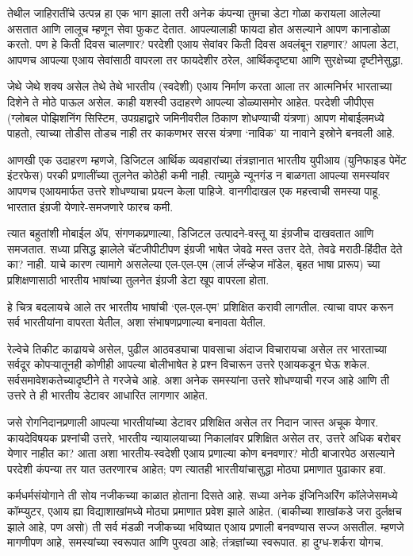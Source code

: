 तेथील जाहिरातींचे उत्पन्न हा एक भाग झाला तरी अनेक कंपन्या तुमचा डेटा गोळा करायला आलेल्या असतात आणि लालूच म्हणून सेवा फुकट देतात. आपल्यालाही फायदा होत असल्याने आपण कानाडोळा करतो. पण हे किती दिवस चालणार? परदेशी एआय सेवांवर किती दिवस अवलंबून राहणार? आपला डेटा, आपणच आपल्या एआय सेवांसाठी वापरला तर फायदेशीर ठरेल, आर्थिकदृष्ट्या आणि सुरक्षेच्या दृष्टीनेसुद्धा.

जेथे जेथे शक्य असेल तेथे तेथे भारतीय (स्वदेशी) एआय निर्माण करता आला तर आत्मनिर्भर भारताच्या दिशेने ते मोठे पाऊल असेल. काही यशस्वी उदाहरणे आपल्या डोळ्यासमोर आहेत. परदेशी जीपीएस (ग्लोबल पोझिशनिंग सिस्टिम, उपग्रहाद्वारे जमिनीवरील ठिकाण शोधण्याची यंत्रणा) आपण मोबाईलमध्ये पाहतो, त्याच्या तोडीस तोडच नाही तर काकणभर सरस यंत्रणा `नाविक' या नावाने इस्रोने बनवली आहे.

आणखी एक उदाहरण म्हणजे, डिजिटल आर्थिक व्यवहारांच्या तंत्रज्ञानात भारतीय युपीआय (युनिफाइड पेमेंट इंटरफेस) परकी प्रणालींच्या तुलनेत कोठेही कमी नाही. त्यामुळे न्यूनगंड न बाळगता आपल्या समस्यांवर आपणच एआयमार्फत उत्तरे शोधण्याचा प्रयत्न केला पाहिजे. वानगीदाखल एक महत्त्वाची समस्या पाहू. भारतात इंग्रजी येणारे-समजणारे फारच कमी.

त्यात बहुतांशी मोबाईल ॲप, संगणकप्रणाल्या, डिजिटल उत्पादने-वस्तू या इंग्रजीच दाखवतात आणि समजतात. सध्या प्रसिद्ध झालेले चॅटजीपीटीपण इंग्रजी भाषेत जेवढे मस्त उत्तर देते, तेवढे मराठी-हिंदीत देते का? नाही. याचे कारण त्यामागे असलेल्या एल-एल-एम (लार्ज लॅन्व्हेज मॉडेल, बृहत भाषा प्रारूप) च्या प्रशिक्षणासाठी भारतीय भाषांच्या तुलनेत इंग्रजी डेटा खूप वापरला होता.

हे चित्र बदलायचे आले तर भारतीय भाषांची `एल-एल-एम' प्रशिक्षित करावी लागतील. त्याचा वापर करून सर्व भारतीयांना वापरता येतील, अशा संभाषणप्रणाल्या बनावता येतील.

रेल्वेचे तिकीट काढायचे असेल, पुढील आठवड्याचा पावसाचा अंदाज विचारायचा असेल तर भारताच्या सर्वदूर कोपऱ्यातूनही कोणीही आपल्या बोलीभाषेत हे प्रश्न विचारून उत्तरे एआयकडून घेऊ शकेल. सर्वसमावेशकतेच्यादृष्टीने ते गरजेचे आहे. अशा अनेक समस्यांना उत्तरे शोधण्याची गरज आहे आणि ती उत्तरे ते ही भारतीय डेटावर आधारित लागणार आहेत.

जसे रोगनिदानप्रणाली आपल्या भारतीयांच्या डेटावर प्रशिक्षित असेल तर निदान जास्त अचूक येणार. कायदेविषयक प्रश्नांची उत्तरे, भारतीय न्यायालयाच्या निकालांवर प्रशिक्षित असेल तर, उत्तरे अधिक बरोबर येणार नाहीत का? आता अशा भारतीय-स्वदेशी एआय प्रणाल्या कोण बनवणार? मोठी बाजारपेठ असल्याने परदेशी कंपन्या तर यात उतरणारच आहेत; पण त्यातही भारतीयांचासुद्धा मोठ्या प्रमाणात पुढाकार हवा.

कर्मधर्मसंयोगाने ती सोय नजीकच्या काळात होताना दिसते आहे. सध्या अनेक इंजिनिअरिंग कॉलेजेसमध्ये कॉम्प्युटर, एआय ह्या विद्याशाखांमध्ये मोठ्या प्रमाणात प्रवेश झाले आहेत. (बाकीच्या शाखांकडे जरा दुर्लक्षच झाले आहे, पण असो) ती सर्व मंडळी नजीकच्या भविष्यात एआय प्रणाली बनवण्यास सज्ज असतील. म्हणजे मागणीपण आहे, समस्यांच्या स्वरूपात आणि पुरवठा आहे; तंत्रज्ञांच्या स्वरूपात. हा दुग्ध-शर्करा योगच.


